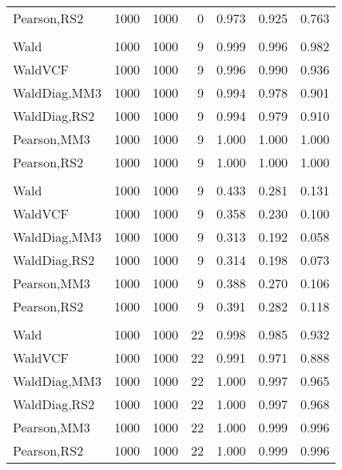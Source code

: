 \documentclass[
]{article}
\begin{document}
\begin{table}[H]
{\begin{tabular}[t]{lrrrrrr}
\hspace{1em}Pearson,RS2 & 1000 & 1000 & 0 & 0.973 & 0.925 & 0.763\\
\addlinespace[0.3em]
\multicolumn{7}{l}{\textbf{1F 15V}}\\
\hspace{1em}Wald & 1000 & 1000 & 9 & 0.999 & 0.996 & 0.982\\
\hspace{1em}WaldVCF & 1000 & 1000 & 9 & 0.996 & 0.990 & 0.936\\
\hspace{1em}WaldDiag,MM3 & 1000 & 1000 & 9 & 0.994 & 0.978 & 0.901\\
\hspace{1em}WaldDiag,RS2 & 1000 & 1000 & 9 & 0.994 & 0.979 & 0.910\\
\hspace{1em}Pearson,MM3 & 1000 & 1000 & 9 & 1.000 & 1.000 & 1.000\\
\hspace{1em}Pearson,RS2 & 1000 & 1000 & 9 & 1.000 & 1.000 & 1.000\\
\addlinespace[0.3em]
\multicolumn{7}{l}{\textbf{2F 10V}}\\
\hspace{1em}Wald & 1000 & 1000 & 9 & 0.433 & 0.281 & 0.131\\
\hspace{1em}WaldVCF & 1000 & 1000 & 9 & 0.358 & 0.230 & 0.100\\
\hspace{1em}WaldDiag,MM3 & 1000 & 1000 & 9 & 0.313 & 0.192 & 0.058\\
\hspace{1em}WaldDiag,RS2 & 1000 & 1000 & 9 & 0.314 & 0.198 & 0.073\\
\hspace{1em}Pearson,MM3 & 1000 & 1000 & 9 & 0.388 & 0.270 & 0.106\\
\hspace{1em}Pearson,RS2 & 1000 & 1000 & 9 & 0.391 & 0.282 & 0.118\\
\addlinespace[0.3em]
\multicolumn{7}{l}{\textbf{3F 15V}}\\
\hspace{1em}Wald & 1000 & 1000 & 22 & 0.998 & 0.985 & 0.932\\
\hspace{1em}WaldVCF & 1000 & 1000 & 22 & 0.991 & 0.971 & 0.888\\
\hspace{1em}WaldDiag,MM3 & 1000 & 1000 & 22 & 1.000 & 0.997 & 0.965\\
\hspace{1em}WaldDiag,RS2 & 1000 & 1000 & 22 & 1.000 & 0.997 & 0.968\\
\hspace{1em}Pearson,MM3 & 1000 & 1000 & 22 & 1.000 & 0.999 & 0.996\\
\hspace{1em}Pearson,RS2 & 1000 & 1000 & 22 & 1.000 & 0.999 & 0.996\\
\bottomrule
\end{tabular}}
\endgroup{}
\end{table}
\end{document}
